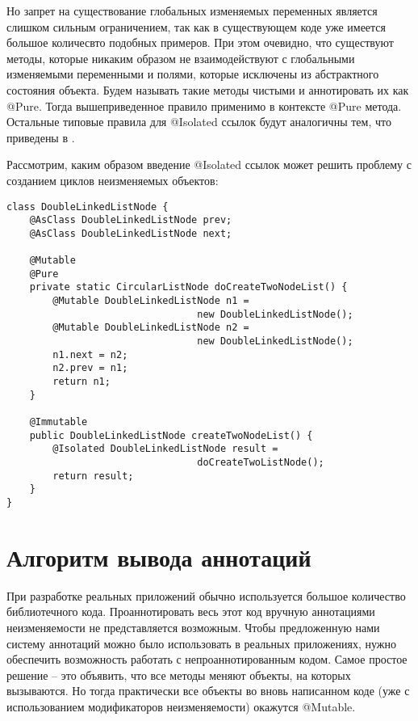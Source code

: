 Но запрет на существование глобальных изменяемых переменных является слишком сильным ограничением, так как в существующем коде уже имеется большое количесвто подобных примеров. При этом очевидно, что существуют методы, которые никаким образом не взаимодействуют с глобальными изменяемыми переменными и полями, которые исключены из абстрактного состояния объекта. Будем называть такие методы чистыми и аннотировать их как @Pure. Тогда вышеприведенное правило применимо в контексте @Pure метода. Остальные типовые правила для @Isolated ссылок будут аналогичны тем, что приведены в \cite{Gordon2012}.

Рассмотрим, каким образом введение @Isolated ссылок может решить проблему с созданием циклов неизменяемых объектов:

\begin{lstlisting}[caption=DoubleLinkedListNode.java, label=code:circular_list_node_isolated]
class DoubleLinkedListNode {
    @AsClass DoubleLinkedListNode prev;
    @AsClass DoubleLinkedListNode next;
    
    @Mutable
    @Pure
    private static CircularListNode doCreateTwoNodeList() {
    	@Mutable DoubleLinkedListNode n1 = 
                                 new DoubleLinkedListNode();
        @Mutable DoubleLinkedListNode n2 = 
                                 new DoubleLinkedListNode();    	
        n1.next = n2;
        n2.prev = n1;    
        return n1;  
    }
    
    @Immutable
    public DoubleLinkedListNode createTwoNodeList() {
        @Isolated DoubleLinkedListNode result = 
                                 doCreateTwoListNode();
        return result;
    }
}
\end{lstlisting} 

\section{Алгоритм вывода аннотаций}

При разработке реальных приложений обычно используется большое количество библиотечного кода. Проаннотировать весь этот код вручную аннотациями неизменяемости не представляется возможным. Чтобы предложенную нами систему аннотаций можно было использовать в реальных приложениях, нужно обеспечить возможность работать с непроаннотированным кодом. Самое простое решение -- это объявить, что все методы меняют объекты, на которых вызываются. Но тогда практически все объекты во вновь написанном коде (уже с использованием модификаторов неизменяемости) окажутся @Mutable. 

